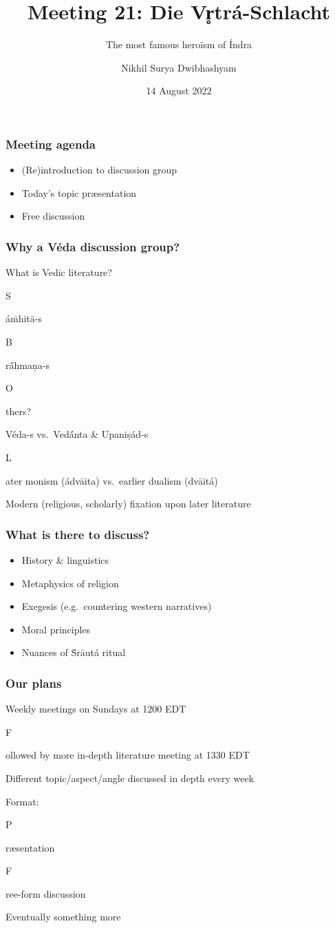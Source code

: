 \documentclass[pdf]{beamer}
\title{Meeting 21: Die Vr̥trá-Schlacht}
\subtitle{The most famous heroïsm of Índra}
\author{Nikhil Surya Dwibhashyam}
\date{14 August 2022}
\newcommand{\Subitem}[1]{{\setlength\itemindent{12pt} \item[-] #1}}
\begin{document}
\frame{\titlepage}

\begin{frame} \frametitle{Meeting agenda}
\begin{itemize}
	\item (Re)introduction to discussion group
	\item Today's topic præsentation
	\item Free discussion
\end{itemize}
\end{frame}

\begin{frame} \frametitle{Why a Véda discussion group?}
\begin{itemize}
	\item What is Vedic literature?
	\Subitem Sáṁhitā-s
	\Subitem Brā́hmaṇa-s
	\Subitem Others?
	\item Véda-s vs.~Vedā́nta \& Upaniṣád-s
	\Subitem Later monism (ádvāita) vs.~earlier dualism (dvāitá)
	\item Modern (religious, scholarly) fixation upon later literature
\end{itemize}
\end{frame}

\begin{frame} \frametitle{What is there to discuss?}
\begin{itemize}
	\item History \& linguistics
	\item Metaphysics of religion
	\item Exegesis (e.g.~countering western narratives)
	\item Moral principles
	\item Nuances of Ṡrāutá ritual
\end{itemize}
\end{frame}

\begin{frame} \frametitle{Our plans}
\begin{itemize}
	\item Weekly meetings on Sundays at 1200 EDT
	\Subitem Followed by more in-depth literature meeting at 1330 EDT
	\item Different topic/aspect/angle discussed in depth every week
	\item Format:
	\Subitem Præsentation
	\Subitem Free-form discussion
	\item Eventually something more
\end{itemize}
\end{frame}
\end{document}
